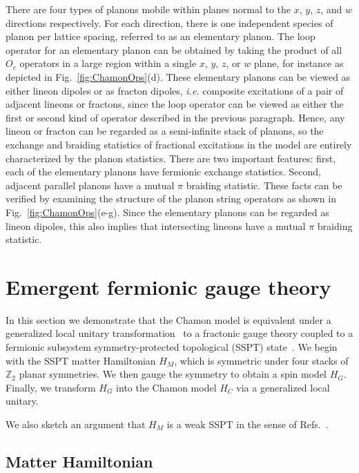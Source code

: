 \documentclass[prx,twocolumn,superscriptaddress,nofootinbib,showpacs,notitlepage]{revtex4-2}
\begin{document}
There are four types of planons mobile within planes normal to the $x$, $y$, $z$, and $w$ directions respectively. For each direction, there is one independent species of planon per lattice spacing, referred to as an elementary planon. The loop operator for an elementary planon can be obtained by taking the product of all $O_c$ operators in a large region within a single $x$, $y$, $z$, or $w$ plane, for instance as depicted in Fig.~\ref{fig:ChamonOps}(d). These elementary planons can be viewed as either lineon dipoles or as fracton dipoles, \textit{i.e.} composite excitations of a pair of adjacent lineons or fractons, since the loop operator can be viewed as either the first or second kind of operator described in the previous paragraph. Hence, any lineon or fracton can be regarded as a semi-infinite stack of planons, so the exchange and braiding statistics of fractional excitations in the model are entirely characterized by the planon statistics. There are two important features: first, each of the elementary planons have fermionic exchange statistics. Second, adjacent parallel planons have a mutual $\pi$ braiding statistic. These facts can be verified by examining the structure of the planon string operators as shown in Fig.~\ref{fig:ChamonOps}(e-g). Since the elementary planons can be regarded as lineon dipoles, this also implies that intersecting lineons have a mutual $\pi$ braiding statistic.

\section{Emergent fermionic gauge theory}
\label{sec:GaugeTheory}

In this section we demonstrate that the Chamon model is equivalent under a generalized local unitary transformation~\cite{ChenLRE2010} to a fractonic gauge theory coupled to a fermionic subsystem symmetry-protected topological (SSPT) state~\cite{you2018subsystem,you2018symmetric}. We begin with the SSPT matter Hamiltonian $H_M$, which is symmetric under four stacks of $\mathbb{Z}_2$ planar symmetries. We then gauge the symmetry to obtain a spin model $H_G$. Finally, we transform $H_G$ into the Chamon model $H_C$ via a generalized local unitary.

We also sketch an argument that $H_M$ is a weak SSPT in the sense of Refs.~\cite{subsystemphaserel,Devakul_2020}.

\subsection{Matter Hamiltonian}
\end{document}
